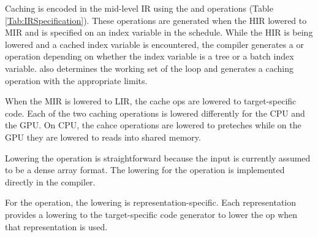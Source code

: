 Caching is encoded in the mid-level IR using the  and  operations (Table \ref{Tab:IRSpecification}). 
These operations are generated when the HIR lowered to MIR and  is specified on an 
index variable in the schedule. While the HIR is being lowered and a cached index variable is 
encountered, the compiler generates a  or  operation depending on 
whether the index variable is a tree or a batch index variable.
\Treebeard{} also determines the working set of the loop  
and generates a caching operation with the appropriate limits.


When the MIR is lowered to LIR, the cache ops are lowered to target-specific code. Each of 
the two caching operations is lowered differently for the CPU and the GPU. On CPU, the cahce operations are lowered to preteches while
on the GPU they are lowered to reads into shared memory.

Lowering the  operation is straightforward
because the input is currently assumed to be a dense
array format. The lowering for the  operation is implemented directly in the \Treebeard{} compiler.

For the  operation, the lowering is representation-specific. Each representation
provides a lowering to the target-specific code 
generator to lower the  op when
that representation is used.
